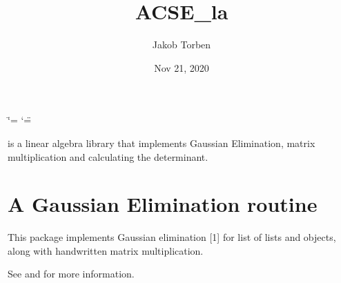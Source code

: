 \documentclass[letterpaper,10pt,english]{sphinxmanual}
\title{ACSE\_la}
\date{Nov 21, 2020}
\author{Jakob Torben}
\begin{document}
\ifdefined\shorthandoff
  \ifnum\catcode`\=\string=\active\shorthandoff{=}\fi
  \ifnum\catcode`\"=\active{}\fi
\fi

\pagestyle{empty}
\sphinxmaketitle
\pagestyle{plain}
\sphinxtableofcontents
\pagestyle{normal}
\label{\detokenize{index::doc}}


 is a linear algebra library that implements Gaussian Elimination, matrix multiplication and calculating the determinant.


\chapter{A Gaussian Elimination routine}
\label{\detokenize{index:a-gaussian-elimination-routine}}
This package implements Gaussian elimination {[}1{]} for list of lists and  objects, along with hand\sphinxhyphen{}written matrix multiplication.

See  and  for more information.
\end{document}
